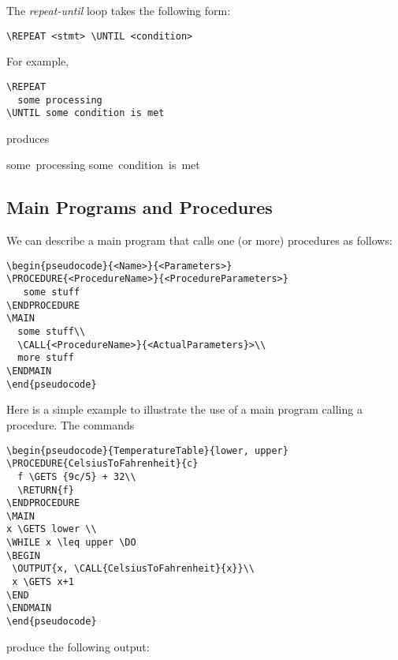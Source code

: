 \documentclass{article}
\begin{document}
The {\em repeat-until} loop takes the following form:

\begin{verbatim}
\REPEAT <stmt> \UNTIL <condition> 
\end{verbatim}

\noindent{}For example,

\begin{verbatim}
\REPEAT
  some processing 
\UNTIL some condition is met 
\end{verbatim}

\noindent{}produces

\medskip
\begin{pseudocode}[display]{}{}
\REPEAT
\mbox{some processing}
\UNTIL \mbox{some condition is met}
\end{pseudocode}

\subsection{Main Programs and Procedures}

We can describe a main program that calls one (or more) procedures as follows:

\begin{verbatim}
\begin{pseudocode}{<Name>}{<Parameters>}
\PROCEDURE{<ProcedureName>}{<ProcedureParameters>}
   some stuff
\ENDPROCEDURE
\MAIN
  some stuff\\
  \CALL{<ProcedureName>}{<ActualParameters}>\\
  more stuff
\ENDMAIN
\end{pseudocode}
\end{verbatim}

Here is a simple example to illustrate the 
use of a main program calling a procedure.
The commands

\begin{verbatim}
\begin{pseudocode}{TemperatureTable}{lower, upper}
\PROCEDURE{CelsiusToFahrenheit}{c}
  f \GETS {9c/5} + 32\\
  \RETURN{f}
\ENDPROCEDURE 
\MAIN
x \GETS lower \\
\WHILE x \leq upper \DO
\BEGIN
 \OUTPUT{x, \CALL{CelsiusToFahrenheit}{x}}\\
 x \GETS x+1
\END
\ENDMAIN
\end{pseudocode}
\end{verbatim}

\noindent{}produce the following output:
\end{document}
